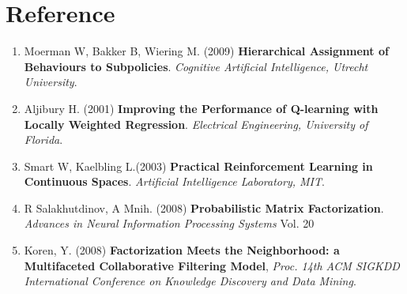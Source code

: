 \documentclass[11pt]{article}
\theoremstyle{definition}
\begin{document}
\section*{\textbf{Reference}}
\begin{enumerate}
\item \label{ref:handbook}
Moerman W, Bakker B, Wiering M. (2009) \textbf{Hierarchical Assignment of Behaviours to Subpolicies}. \textit{Cognitive Artificial Intelligence, Utrecht University}. 
\item \label{ref:MFieee}
Aljibury H. (2001) \textbf{Improving the Performance of Q-learning with Locally Weighted Regression}. \textit{Electrical Engineering, University of Florida}. 
\item \label{ref:WLA}
Smart W,  Kaelbling L.(2003) \textbf{Practical Reinforcement Learning in Continuous Spaces}. \textit{Artificial Intelligence Laboratory, MIT}.
\item \label{ref:PMF}
R Salakhutdinov, A Mnih. (2008) \textbf{Probabilistic Matrix Factorization}. \textit{Advances in Neural Information Processing Systems} Vol. 20

\item \label{ref:implicit}
Koren, Y. (2008) \textbf{Factorization Meets the Neighborhood: a Multifaceted Collaborative Filtering Model}, \textit{Proc. 14th ACM SIGKDD International Conference on Knowledge Discovery and
Data Mining}.

\end{enumerate}
\end{document}
